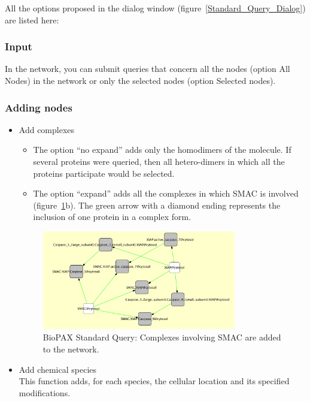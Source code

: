 All the options proposed in the dialog window (figure~\ref{Standard_Query_Dialog}) are listed here:

\subsubsection{Input}

In the network, you can submit queries that concern all the nodes (option All Nodes) in the network or only the selected nodes (option Selected nodes). 

\subsubsection{Adding nodes}


\begin{itemize}
\item Add complexes
\begin{itemize}
\item The option “no expand” adds only the homodimers of the molecule. If several proteins were queried,
then all hetero-dimers in which all the proteins participate would be selected.
\item The option “expand” adds all the complexes in which SMAC is involved
(figure~\ref{Standard_Query_Add_complexes}b). The green arrow with a diamond
ending represents the inclusion of one protein in a complex form.
\end{itemize}

\begin{figure}
\centering
\includegraphics[width=0.8\textwidth]{graphics/ebo_smac_prot_complex}
\caption{BioPAX Standard Query: Complexes involving SMAC are added to the network.}
\label{Standard_Query_Add_complexes}
\end{figure}

\item Add chemical species\\
This function adds, for each species, the cellular location and its specified modifications.


\end{itemize}
